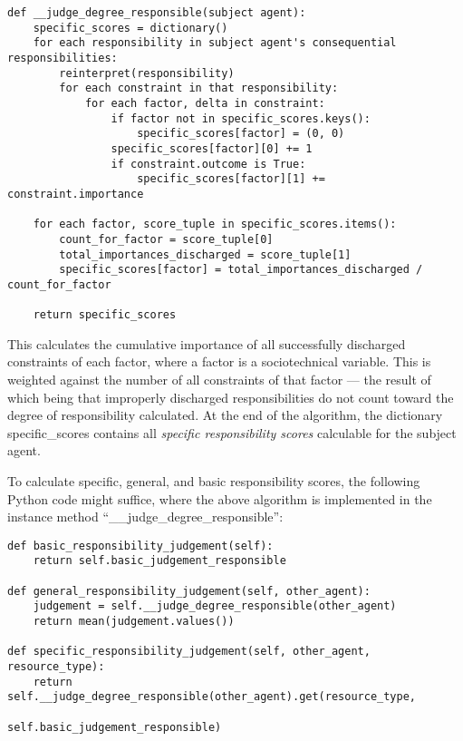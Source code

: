 \begin{lstlisting}[language=pseudocode]
def __judge_degree_responsible(subject agent):
    specific_scores = dictionary()
    for each responsibility in subject agent's consequential responsibilities:
        reinterpret(responsibility)
        for each constraint in that responsibility:
            for each factor, delta in constraint:
                if factor not in specific_scores.keys():
                    specific_scores[factor] = (0, 0)
                specific_scores[factor][0] += 1
                if constraint.outcome is True:
                    specific_scores[factor][1] += constraint.importance
                    
    for each factor, score_tuple in specific_scores.items():
        count_for_factor = score_tuple[0]
        total_importances_discharged = score_tuple[1]
        specific_scores[factor] = total_importances_discharged / count_for_factor
        
    return specific_scores
\end{lstlisting} 

This calculates the cumulative importance of all successfully discharged constraints of each factor, where a factor is a sociotechnical variable. This is weighted against the number of all constraints of that factor --- the result of which being that improperly discharged responsibilities do not count toward the degree of responsibility calculated. At the end of the algorithm, the dictionary specific\_scores contains all \emph{specific responsibility scores} calculable for the subject agent.\par

To calculate specific, general, and basic responsibility scores, the following Python code might suffice, where the above algorithm is implemented in the instance method ``\_\_judge\_degree\_responsible'':

\begin{lstlisting}
def basic_responsibility_judgement(self):
    return self.basic_judgement_responsible

def general_responsibility_judgement(self, other_agent):
    judgement = self.__judge_degree_responsible(other_agent)
    return mean(judgement.values())

def specific_responsibility_judgement(self, other_agent, resource_type):
    return self.__judge_degree_responsible(other_agent).get(resource_type,
                                                            self.basic_judgement_responsible)
\end{lstlisting}

